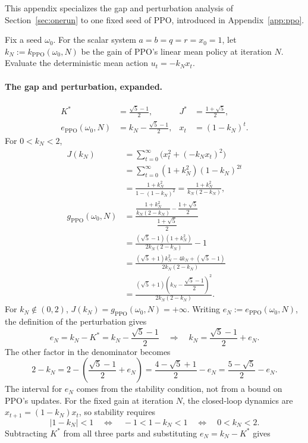 \documentclass[11pt]{article}
\begin{document}
This appendix specializes the gap and perturbation analysis of Section~\ref{sec:onerun}
to one fixed seed of PPO, introduced in Appendix~\ref{app:ppo}.

Fix a seed $\omega_0$. For the scalar system $a=b=q=r=x_0=1$, let
$k_N := k_{\mathrm{PPO}}(\omega_0,N)$ be the gain of PPO's linear mean policy
at iteration $N$. Evaluate the deterministic mean action $u_t=-k_Nx_t$.

\paragraph{The gap and perturbation, expanded.}
\begin{align*}
  K^* &= \frac{\sqrt{5}-1}{2}, & J^* &= \frac{1+\sqrt{5}}{2}, \\
  e_{\mathrm{PPO}}(\omega_0,N)
    &= k_N-\frac{\sqrt{5}-1}{2}, &
  x_t &= (1-k_N)^t .
\end{align*}
For $0<k_N<2$,
\begin{align*}
  J(k_N)
    &= \sum_{t=0}^{\infty}\big(x_t^2+(-k_Nx_t)^2\big) \\
    &= \sum_{t=0}^{\infty}(1+k_N^2)(1-k_N)^{2t} \\
    &= \frac{1+k_N^2}{1-(1-k_N)^2}
     = \frac{1+k_N^2}{k_N(2-k_N)}, \\
  g_{\mathrm{PPO}}(\omega_0,N)
    &= \frac{\dfrac{1+k_N^2}{k_N(2-k_N)}-\dfrac{1+\sqrt{5}}{2}}
             {\dfrac{1+\sqrt{5}}{2}} \\
    &= \frac{(\sqrt{5}-1)(1+k_N^2)}{2k_N(2-k_N)}-1 \\
    &= \frac{(\sqrt{5}+1)k_N^2-4k_N+(\sqrt{5}-1)}{2k_N(2-k_N)} \\
    &= \frac{(\sqrt{5}+1)\left(k_N-\dfrac{\sqrt{5}-1}{2}\right)^2}
             {2k_N(2-k_N)} .
\end{align*}
For $k_N\notin(0,2)$, $J(k_N)=g_{\mathrm{PPO}}(\omega_0,N)=+\infty$.
Writing $e_N:=e_{\mathrm{PPO}}(\omega_0,N)$, the definition of the perturbation gives
\[
  e_N=k_N-K^*=k_N-\frac{\sqrt{5}-1}{2}
  \quad\Longrightarrow\quad
  k_N=\frac{\sqrt{5}-1}{2}+e_N.
\]
The other factor in the denominator becomes
\[
  2-k_N=2-\left(\frac{\sqrt{5}-1}{2}+e_N\right)
  =\frac{4-\sqrt{5}+1}{2}-e_N
  =\frac{5-\sqrt{5}}{2}-e_N.
\]
The interval for $e_N$ comes from the stability condition, not from a bound on PPO's
updates. For the fixed gain at iteration $N$, the closed-loop dynamics are
$x_{t+1}=(1-k_N)x_t$, so stability requires
\[
  |1-k_N|<1
  \quad\Longleftrightarrow\quad -1<1-k_N<1
  \quad\Longleftrightarrow\quad 0<k_N<2.
\]
Subtracting $K^*$ from all three parts and substituting $e_N=k_N-K^*$ gives
\end{document}

